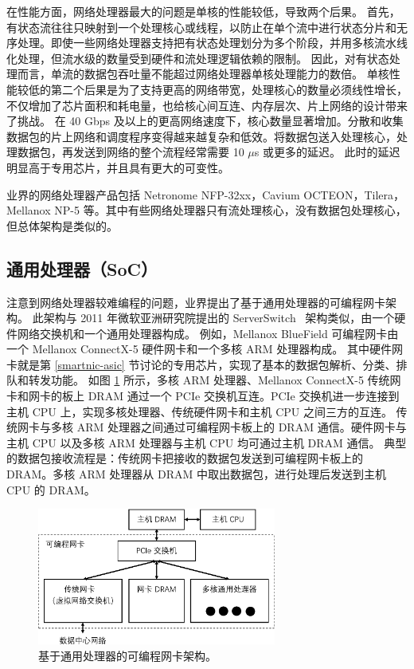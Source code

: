 在性能方面，网络处理器最大的问题是单核的性能较低，导致两个后果。
首先，有状态流往往只映射到一个处理核心或线程，以防止在单个流中进行状态分片和无序处理。即使一些网络处理器支持把有状态处理划分为多个阶段，并用多核流水线化处理，但流水级的数量受到硬件和流处理逻辑依赖的限制。
因此，对有状态处理而言，单流的数据包吞吐量不能超过网络处理器单核处理能力的数倍。
单核性能较低的第二个后果是为了支持更高的网络带宽，处理核心的数量必须线性增长，不仅增加了芯片面积和耗电量，也给核心间互连、内存层次、片上网络的设计带来了挑战。
在 40 Gbps 及以上的更高网络速度下，核心数量显著增加。分散和收集数据包的片上网络和调度程序变得越来越复杂和低效。将数据包送入处理核心，处理数据包，再发送到网络的整个流程经常需要 10 $\mu$s 或更多的延迟。
此时的延迟明显高于专用芯片，并且具有更大的可变性。


业界的网络处理器产品包括 Netronome NFP-32xx，Cavium OCTEON，Tilera，Mellanox NP-5 等。其中有些网络处理器只有流处理核心，没有数据包处理核心，但总体架构是类似的。




\subsection{通用处理器（SoC）}
\label{smartnic-soc}

注意到网络处理器较难编程的问题，业界提出了基于通用处理器的可编程网卡架构。
此架构与 2011 年微软亚洲研究院提出的 ServerSwitch~\cite{lu2011serverswitch} 架构类似，由一个硬件网络交换机和一个通用处理器构成。
例如，Mellanox BlueField \cite{mellanox-bluefield} 可编程网卡由一个 Mellanox ConnectX-5 硬件网卡和一个多核 ARM 处理器构成。
其中硬件网卡就是第 \ref{smartnic-asic} 节讨论的专用芯片，实现了基本的数据包解析、分类、排队和转发功能。
如图 \ref{background:fig:smartnic_soc} 所示，多核 ARM 处理器、Mellanox ConnectX-5 传统网卡和网卡的板上 DRAM 通过一个 PCIe 交换机互连。PCIe 交换机进一步连接到主机 CPU 上，实现多核处理器、传统硬件网卡和主机 CPU 之间三方的互连。
传统网卡与多核 ARM 处理器之间通过可编程网卡板上的 DRAM 通信。硬件网卡与主机 CPU 以及多核 ARM 处理器与主机 CPU 均可通过主机 DRAM 通信。
典型的数据包接收流程是：传统网卡把接收的数据包发送到可编程网卡板上的 DRAM。多核 ARM 处理器从 DRAM 中取出数据包，进行处理后发送到主机 CPU 的 DRAM。


\begin{figure}[htbp]
	\centering
	\includegraphics[width=0.7\textwidth]{figures/smartnic_soc.pdf}
	\caption{基于通用处理器的可编程网卡架构。}
	\label{background:fig:smartnic_soc}
\end{figure}


